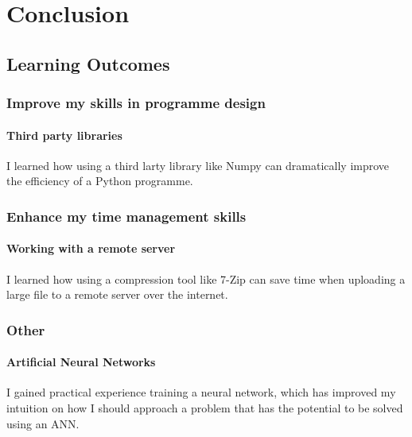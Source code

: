 \section{Conclusion}
    \subsection{Learning Outcomes}
        \subsubsection{Improve my skills in programme design}
            \paragraph{Third party libraries} I learned how using a third larty library like Numpy can dramatically improve the efficiency of a Python programme.
        \subsubsection{Enhance my time management skills}
            \paragraph{Working with a remote server} I learned how using a compression tool like 7-Zip can save time when uploading a large file to a remote server over the internet.
        \subsubsection{Other}
            \paragraph{Artificial Neural Networks} I gained practical experience training a neural network, which has improved my intuition on how I should approach a problem that has the potential to be solved using an ANN.